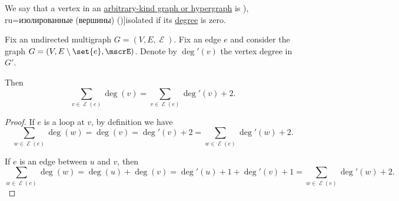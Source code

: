 \begin{definition}\label{def:isolated_vertex}
  We say that a vertex in an \hyperref[rem:arbitrary_kind_graph]{arbitrary-kind graph or hypergraph} is \term[bg=изолирани (върхове) (\cite[8]{Мирчев2001Графи}), ru=изолированные (вершины) (\cite[26]{Емеличев1990Графы})]{isolated} if its \hyperref[def:graph_cardinality/directed_degree]{degree} is zero.
\end{definition}

\begin{lemma}\label{thm:sum_of_endpoint_degrees}
  Fix an undirected multigraph \( G = (V, E, \mscrE) \). Fix an edge \( e \) and consider the graph \( G = (V, E \setminus \set{ e }, \mscrE) \). Denote by \( \deg'(v) \) the vertex degree in \( G' \).

  Then
  \begin{equation}\label{eq:thm:sum_of_endpoint_degrees}
    \sum_{v \in \mscrE(e)} \deg(v) = \sum_{v \in \mscrE(e)} \deg'(v) + 2.
  \end{equation}
\end{lemma}
\begin{proof}
  If \( e \) is a loop at \( v \), by definition we have
  \begin{equation*}
    \sum_{w \in \mscrE(e)} \deg(w) = \deg(v) = \deg'(v) + 2 = \sum_{w \in \mscrE(e)} \deg'(w) + 2.
  \end{equation*}

  If \( e \) is an edge between \( u \) and \( v \), then
  \begin{equation*}
    \sum_{w \in \mscrE(e)} \deg(w)
    =
    \deg(u) + \deg(v)
    =
    \deg'(u) + 1 + \deg'(v) + 1
    =
    \sum_{w \in \mscrE(e)} \deg'(w) + 2.
  \end{equation*}
\end{proof}

